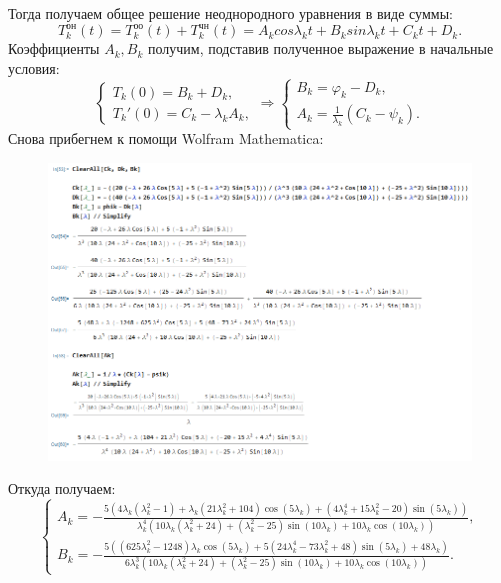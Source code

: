 \documentclass[11pt]{article}
\begin{document}
Тогда получаем общее решение неоднородного уравнения в виде суммы:
$$T_k^{\text{он}}(t)=T_k^{\text{оо}}(t)+T_k^{\text{чн}}(t)=A_kcos\lambda_kt+B_ksin\lambda_kt+C_kt+D_k.$$
Коэффициенты $A_k, B_k$ получим, подставив полученное выражение в начальные условия:
$$\begin{cases}
    T_k(0)=B_k+D_k,\\
    T_k'(0)=C_k-\lambda_kA_k,
\end{cases} \Rightarrow
\begin{cases}
    B_k=\varphi_k-D_k,\\
    A_k = \frac{1}{\lambda_k}(C_k - \psi_k).
\end{cases}$$
Снова прибегнем к помощи Wolfram Mathematica:
\begin{figure}
    \centering
    \includegraphics[width=1\linewidth]{image2.png}
\end{figure}
Откуда получаем:
$$\begin{cases}
    A_k=-\frac{5 \left(4 \lambda_k  \left(\lambda_k ^2-1\right)+\lambda_k  \left(21 \lambda_k ^2+104\right) \cos (5 \lambda_k )+\left(4 \lambda_k ^4+15 \lambda_k ^2-20\right) \sin (5 \lambda_k )\right)}{\lambda_k ^4 \left(10 \lambda_k  \left(\lambda_k ^2+24\right)+\left(\lambda_k ^2-25\right) \sin (10 \lambda_k )+10 \lambda_k  \cos (10 \lambda_k )\right)},\\
    B_k=-\frac{5 \left(\left(625 \lambda_k ^2-1248\right) \lambda_k  \cos (5 \lambda_k )+5 \left(24 \lambda_k ^4-73 \lambda_k ^2+48\right) \sin (5 \lambda_k )+48 \lambda_k \right)}{6 \lambda_k ^3 \left(10 \lambda_k  \left(\lambda_k ^2+24\right)+\left(\lambda_k ^2-25\right) \sin (10 \lambda_k )+10 \lambda_k  \cos (10 \lambda_k )\right)}.
\end{cases}$$
\end{document}
